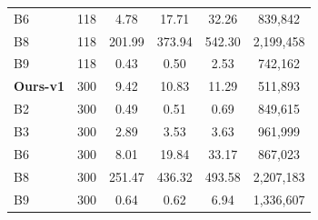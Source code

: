 \begin{table}[t]
\begin{tabular}{lccccc}
B6 & 118 & 4.78 & 17.71 & 32.26 & 839,842 \\
B8 & 118 & 201.99 & 373.94 & 542.30 & 2,199,458 \\
B9 & 118 & 0.43 & 0.50 & 2.53 & 742,162 \\
\textbf{Ours-v1} & 300 & 9.42 & 10.83 & 11.29 & 511,893 \\
B2 & 300 & 0.49 & 0.51 & 0.69 & 849,615 \\
B3 & 300 & 2.89 & 3.53 & 3.63 & 961,999 \\
B6 & 300 & 8.01 & 19.84 & 33.17 & 867,023 \\
B8 & 300 & 251.47 & 436.32 & 493.58 & 2,207,183 \\
B9 & 300 & 0.64 & 0.62 & 6.94 & 1,336,607 \\
\bottomrule
\end{tabular}
\end{table}